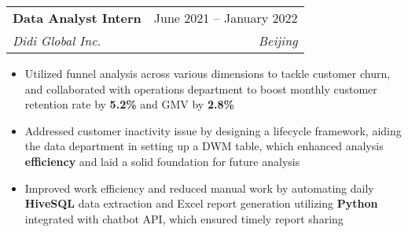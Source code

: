 \documentclass[letterpaper,11pt]{article}
\makeatletter
\newcommand{\resumeItem}[1]{
  \item\small{
    {#1 \vspace{-2pt}}
  }
}
\newcommand{\resumeSubheading}[4]{
  \vspace{-2pt}\item
    \begin{tabular*}{0.97\textwidth}[t]{l@{\extracolsep{\fill}}r}
      \textbf{#1} & #2 \\
      \textit{\small#3} & \textit{\small #4} \\
    \end{tabular*}\vspace{-7pt}
}
\newcommand{\resumeSubSubheading}[2]{
    \item
    \begin{tabular*}{0.97\textwidth}{l@{\extracolsep{\fill}}r}
      \textit{\small#1} & \textit{\small #2} \\
    \end{tabular*}\vspace{-7pt}
}
\newcommand{\resumeSubHeadingListEnd}{\end{itemize}}
\newcommand{\resumeItemListStart}{\begin{itemize}}
\newcommand{\resumeItemListEnd}{\end{itemize}\vspace{-5pt}}
\makeatother
\begin{document}
    \resumeSubheading
      {Data Analyst Intern}{June 2021 -- January 2022}
      {Didi Global Inc.}{Beijing}
      \resumeItemListStart
        \resumeItem{Utilized funnel analysis across various dimensions to tackle customer churn, and collaborated with operations department to boost monthly customer retention rate by \textbf{5.2\%} and GMV by \textbf{2.8\%}}
        \resumeItem{Addressed customer inactivity issue by designing a lifecycle framework, aiding the data department in setting up a DWM table, which enhanced analysis \textbf{efficiency} and laid a solid foundation for future analysis}
        \resumeItem{Improved work efficiency and reduced manual work by automating daily \textbf{HiveSQL} data extraction and Excel report generation utilizing \textbf{Python} integrated with chatbot API, which ensured timely report sharing}
      \resumeItemListEnd
      

\end{document}
